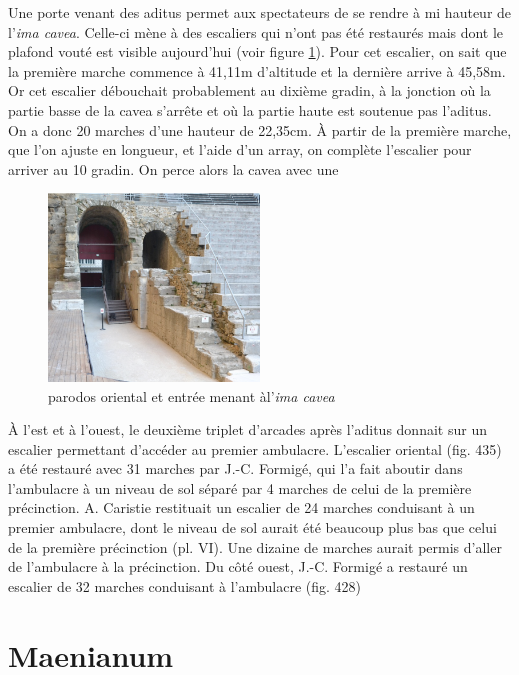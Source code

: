 Une porte venant des aditus permet aux spectateurs de se rendre à mi hauteur de l'\textit{ima cavea}. Celle-ci mène à des escaliers qui n'ont pas été restaurés mais dont le plafond vouté est visible aujourd'hui (voir figure \ref{parodos}). Pour cet escalier, on sait que la première marche commence à 41,11m d'altitude et la dernière arrive à 45,58m. Or cet escalier débouchait probablement au dixième gradin, à la jonction où la partie basse de la cavea s'arrête et où la partie haute est soutenue pas l'aditus. On a donc 20 marches d'une hauteur de 22,35cm. \`{A} partir de la première marche, que l'on ajuste en longueur, et l'aide d'un \gls{array}, on complète l'escalier pour arriver au 10 gradin. On perce alors la cavea avec une 


\begin{figure}[!h]
	\centering
	\includegraphics[width=0.5\textwidth]{images/parodos}
	\caption[\Gls{parodos} oriental et entrée menant àl'\textit{ima cavea}]{\Gls{parodos} oriental et entrée menant àl'\textit{ima cavea} \cite[fig. 418]{orangeTxt}} 
	\label{parodos} 
\end{figure}

\`{A} l'est et à l'ouest, le deuxième triplet d'arcades après l'\gls{aditus} donnait sur un escalier permettant d'accéder au premier \gls{ambulacre}. L'escalier oriental (fig. 435) a été restauré avec 31 marches par J.-C. Formigé, qui l'a
fait aboutir dans l'ambulacre à un niveau de sol séparé par 4 marches de celui de la première précinction.  A. Caristie restituait un escalier de 24 marches conduisant à un premier ambulacre, dont le niveau de
sol aurait été beaucoup plus bas que celui de la première précinction (pl. VI). Une dizaine de
marches aurait permis d'aller de l'ambulacre à la précinction.
Du côté ouest, J.-C. Formigé a restauré un escalier de 32 marches conduisant à
l'ambulacre (fig. 428)


		\section{Maenianum} 

